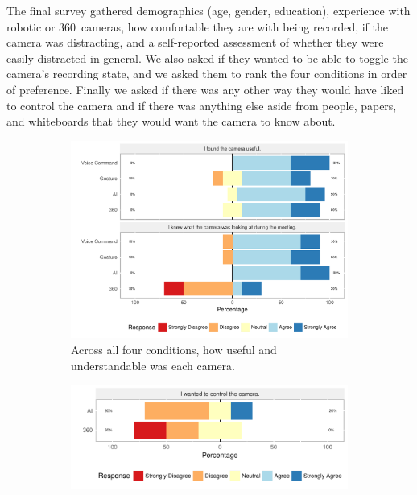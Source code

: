 \documentclass{tufte-handout}
\begin{document}
The final survey gathered demographics (age, gender, education),
experience with robotic or 360\textdegree\ cameras, how comfortable
they are with being recorded, if the camera was distracting, and
a self-reported assessment of whether they were easily distracted in
general. We also asked if they wanted to be able to toggle the
camera's recording state, and we asked them to rank the four
conditions in order of preference.  Finally we asked if there was any
other way they would have liked to control the camera and if there was
anything else aside from people, papers, and whiteboards that they
would want the camera to know about. 

\begin{figure}
  \centering
  \begin{subfigure}[b]{0.6\textwidth}
  \includegraphics[width=\textwidth]{figures/likerts/likert-woz-1}
  \caption{\label{fig:likert-overview} Across all four conditions, how
  useful and understandable was each camera.}
\vspace{1pc}  
\end{subfigure}
\begin{subfigure}[b]{0.6\textwidth}
  \centering
  \includegraphics[width=\textwidth]{figures/likerts/likert-woz-2}

\end{subfigure}
\end{figure}
\end{document}
